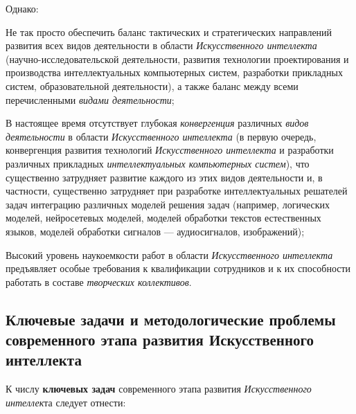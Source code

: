 Однако:
\begin{textitemize}
	\item
	Не так просто обеспечить баланс тактических и стратегических направлений развития всех видов деятельности в области \textit{Искусственного интеллекта} (научно-исследовательской деятельности, развития технологии проектирования и производства интеллектуальных компьютерных систем, разработки прикладных систем, образовательной деятельности), а также баланс между всеми перечисленными \textit{видами деятельности};
	\item
	В настоящее время отсутствует глубокая \textit{конвергенция} различных \textit{видов деятельности} в области \textit{Искусственного интеллекта} (в первую очередь, конвергенция развития технологий \textit{Искусственного интеллекта} и разработки различных прикладных \textit{интеллектуальных компьютерных систем}), что существенно затрудняет развитие каждого из этих видов деятельности и, в частности, существенно затрудняет при разработке интеллектуальных решателей задач интеграцию различных моделей решения задач (например, логических моделей, нейросетевых моделей, моделей обработки текстов естественных языков, моделей обработки сигналов --- аудиосигналов, изображений);
	\item
	Высокий уровень наукоемкости работ в области \textit{Искусственного интеллекта} предъявляет особые требования к квалификации сотрудников и к их способности работать в составе \textit{творческих коллективов}.
\end{textitemize}

\subsection{Ключевые задачи и методологические проблемы современного этапа развития Искусственного интеллекта}
\label{subsec_key_tasks_and_methodological_problems_current_stage_development_AI}

К числу \textbf{ключевых задач} современного этапа развития \textit{Искусственного интеллек}та следует отнести:

